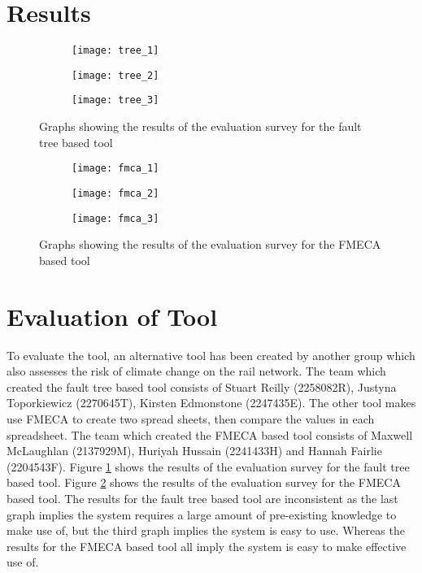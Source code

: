\documentclass[11pt,a4]{article}
\begin{document}
\section{Results}
\begin{figure}[h]
	\centering
	\begin{subfigure}[b]{0.7\textwidth}
		\texttt{[image: tree\_1]}
	\end{subfigure}
	\begin{subfigure}[b]{0.7\textwidth}
		\texttt{[image: tree\_2]}
	\end{subfigure}
	\begin{subfigure}[b]{0.3\textwidth}
		\texttt{[image: tree\_3]}
	\end{subfigure}
	\caption{Graphs showing the results of the evaluation survey for the fault tree
		based tool}
	\label{fig:eval}
\end{figure}

\begin{figure}[h]
	\centering
	\begin{subfigure}[b]{0.7\textwidth}
		\texttt{[image: fmca\_1]}
	\end{subfigure}
	\begin{subfigure}[b]{0.7\textwidth}
		\texttt{[image: fmca\_2]}
	\end{subfigure}
	\begin{subfigure}[b]{0.3\textwidth}
		\texttt{[image: fmca\_3]}
	\end{subfigure}
	\caption{Graphs showing the results of the evaluation survey for the FMECA
		based tool}
	\label{fig:fmca}
\end{figure}

\FloatBarrier
\section{Evaluation of Tool}
To evaluate the tool, an alternative tool has been created by another group which also
assesses the risk of climate change on the rail network.
The team which created the fault tree based tool consists of Stuart Reilly (2258082R),
Justyna Toporkiewicz (2270645T), Kirsten Edmonstone (2247435E).
The other tool makes use FMECA to create two spread sheets, then compare the values in
each spreadsheet.
The team which created the FMECA based tool consists of Maxwell McLaughlan (2137929M),
Huriyah Hussain (2241433H) and Hannah Fairlie (2204543F).
Figure \ref{fig:eval} shows the results of the evaluation survey for the fault tree based
tool.
Figure \ref{fig:fmca} shows the results of the evaluation survey for the FMECA based tool.
The results for the fault tree based tool are inconsistent as the last graph implies the
system requires a large amount of pre-existing knowledge to make use of, but the third
graph implies the system is easy to use.
Whereas the results for the FMECA based tool all imply the system is easy to make
effective use of.
\end{document}
